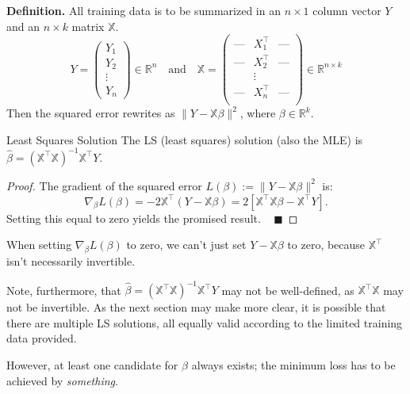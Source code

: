 \textbf{Definition.}
All training data is to be summarized in
an $n \times 1$ column vector $Y$ and
an $n \times k$ matrix $\mathbb{X}$.
\[
Y = \begin{pmatrix}
Y_1 \\ Y_2 \\ \vdots \\ Y_n
\end{pmatrix} \in \mathbb{R}^n
~~~ \text{ and } ~~~
\mathbb{X} = \begin{pmatrix}
\text{---} & X_1^{\top} & \text{---} \\
\text{---} & X_2^{\top} & \text{---} \\
& \vdots & \\
\text{---} & X_n^{\top} & \text{---} \\
\end{pmatrix} \in \mathbb{R}^{n \times k}
\]
Then the squared error rewrites as
$\|Y - \mathbb{X}\beta\|^2$,
where $\beta \in \mathbb{R}^k$.

\begin{theorem}{Least Squares Solution}
    The LS (least squares) solution (also the MLE)
    is $\hat{\beta} = (\mathbb{X}^{\top}\mathbb{X})^{-1}\mathbb{X}^{\top}Y$.
\end{theorem}

\begin{proof}
    The gradient of the squared error
    $L(\beta) := \|Y - \mathbb{X}\beta\|^2$ is:
    \[ \nabla_{\beta} L(\beta)
    = -2\mathbb{X}^{\top}(Y - \mathbb{X}\beta)
    = 2 \left[
        \mathbb{X}^{\top}\mathbb{X}\beta - \mathbb{X}^{\top}Y
    \right]. \]
    Setting this equal to zero yields the promised result. ~ $\blacksquare$
\end{proof}

\begin{remark}
    When setting $\nabla_{\beta}L(\beta)$ to zero,
    we can't just set $Y - \mathbb{X}\beta$ to zero,
    because $\mathbb{X}^{\top}$ isn't necessarily invertible.

    Note, furthermore, that
    $\hat{\beta} = (\mathbb{X}^{\top}\mathbb{X})^{-1}\mathbb{X}^{\top}Y$
    may not be well-defined,
    as $\mathbb{X}^{\top}\mathbb{X}$ may not be invertible.
    As the next section may make more clear,
    it is possible that there are multiple LS solutions,
    all equally valid according to the limited training data provided.

    However, at least one candidate for $\hat{\beta}$ always exists;
    the minimum loss has to be achieved by \emph{something}.
\end{remark}

